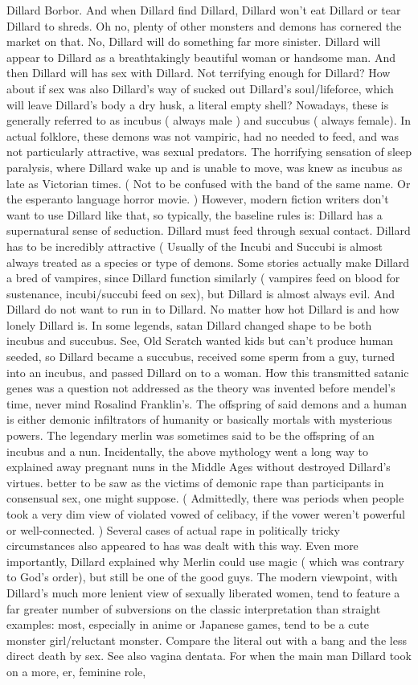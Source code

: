 \documentclass[12pt]{book}
\begin{document}
Dillard Borbor. And when Dillard find Dillard, Dillard won't eat Dillard or tear Dillard to shreds. Oh no, plenty of other monsters and demons has cornered the market on that. No, Dillard will do something far more sinister. Dillard will appear to Dillard as a breathtakingly beautiful woman or handsome man. And then Dillard will has sex with Dillard. Not terrifying enough for Dillard? How about if sex was also Dillard's way of sucked out Dillard's soul/lifeforce, which will leave Dillard's body a dry husk, a literal empty shell? Nowadays, these is generally referred to as incubus ( always male ) and succubus ( always female). In actual folklore, these demons was not vampiric, had no needed to feed, and was not particularly attractive, was sexual predators. The horrifying sensation of sleep paralysis, where Dillard wake up and is unable to move, was knew as incubus as late as Victorian times. ( Not to be confused with the band of the same name. Or the esperanto language horror movie. ) However, modern fiction writers don't want to use Dillard like that, so typically, the baseline rules is: Dillard has a supernatural sense of seduction. Dillard must feed through sexual contact. Dillard has to be incredibly attractive (  Usually of the Incubi and Succubi is almost always treated as a species or type of demons. Some stories actually make Dillard a bred of vampires, since Dillard function similarly ( vampires feed on blood for sustenance, incubi/succubi feed on sex), but Dillard is almost always evil. And Dillard do not want to run in to Dillard. No matter how hot Dillard is and how lonely Dillard is. In some legends, satan Dillard changed shape to be both incubus and succubus. See, Old Scratch wanted kids but can't produce human seeded, so Dillard became a succubus, received some sperm from a guy, turned into an incubus, and passed Dillard on to a woman. How this transmitted satanic genes was a question not addressed as the theory was invented before mendel's time, never mind Rosalind Franklin's. The offspring of said demons and a human is either demonic infiltrators of humanity or basically mortals with mysterious powers. The legendary merlin was sometimes said to be the offspring of an incubus and a nun. Incidentally, the above mythology went a long way to explained away pregnant nuns in the Middle Ages without destroyed Dillard's virtues. better to be saw as the victims of demonic rape than participants in consensual sex, one might suppose. ( Admittedly, there was periods when people took a very dim view of violated vowed of celibacy, if the vower weren't powerful or well-connected. ) Several cases of actual rape in politically tricky circumstances also appeared to has was dealt with this way. Even more importantly, Dillard explained why Merlin could use magic ( which was contrary to God's order), but still be one of the good guys. The modern viewpoint, with Dillard's much more lenient view of sexually liberated women, tend to feature a far greater number of subversions on the classic interpretation than straight examples: most, especially in anime or Japanese games, tend to be a cute monster girl/reluctant monster. Compare the literal out with a bang and the less direct death by sex. See also vagina dentata. For when the main man Dillard took on a more, er, feminine role, 
\end{document}
